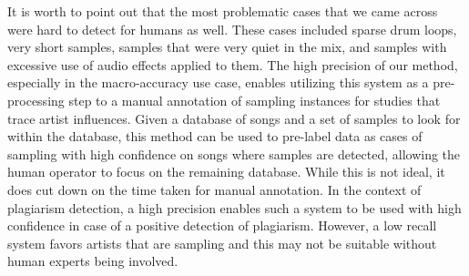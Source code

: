 \documentclass{article}
\begin{document}
It is worth to point out that the most problematic cases that we came across were hard to detect for humans as well. These cases included sparse drum loops, very short samples, samples that were very quiet in the mix, and samples with excessive use of audio effects applied to them. %
The high precision of our method, especially in the macro-accuracy use case, enables utilizing this system as a pre-processing step to a manual annotation of sampling instances for studies that trace artist influences. Given a database of songs and a set of samples to look for within the database, this method can be used to pre-label data as cases of sampling with high confidence on songs where samples are detected, allowing the human operator to focus on the remaining database. While this is not ideal, it does cut down on the time taken for manual annotation.
In the context of plagiarism detection, a high precision enables such a system to be used with high confidence in case of a positive detection of plagiarism. However, a low recall system favors artists that are sampling and this may not be suitable without human experts being involved.%


\end{document}
